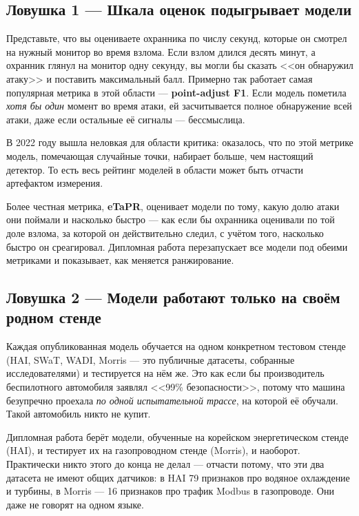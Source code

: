 \documentclass[11pt,a4paper]{article}
\begin{document}
\subsection{Ловушка 1 --- Шкала оценок подыгрывает модели}

Представьте, что вы оцениваете охранника по числу секунд, которые он смотрел на нужный монитор во время взлома. Если взлом длился десять минут, а охранник глянул на монитор одну секунду, вы могли бы сказать <<он обнаружил атаку>> и поставить максимальный балл. Примерно так работает самая популярная метрика в этой области --- \textbf{point-adjust F1}. Если модель пометила \emph{хотя бы один} момент во время атаки, ей засчитывается полное обнаружение всей атаки, даже если остальные её сигналы --- бессмыслица.

В 2022 году вышла неловкая для области критика: оказалось, что по этой метрике модель, помечающая случайные точки, набирает больше, чем настоящий детектор. То есть весь рейтинг моделей в области может быть отчасти артефактом измерения.

Более честная метрика, \textbf{eTaPR}, оценивает модели по тому, какую долю атаки они поймали и насколько быстро --- как если бы охранника оценивали по той доле взлома, за которой он действительно следил, с учётом того, насколько быстро он среагировал. Дипломная работа перезапускает все модели под обеими метриками и показывает, как меняется ранжирование.

\subsection{Ловушка 2 --- Модели работают только на своём родном стенде}

Каждая опубликованная модель обучается на одном конкретном тестовом стенде (HAI, SWaT, WADI, Morris --- это публичные датасеты, собранные исследователями) и тестируется на нём же. Это как если бы производитель беспилотного автомобиля заявлял <<99\% безопасности>>, потому что машина безупречно проехала \emph{по одной испытательной трассе}, на которой её обучали. Такой автомобиль никто не купит.

Дипломная работа берёт модели, обученные на корейском энергетическом стенде (HAI), и тестирует их на газопроводном стенде (Morris), и наоборот. Практически никто этого до конца не делал --- отчасти потому, что эти два датасета не имеют общих датчиков: в HAI 79 признаков про водяное охлаждение и турбины, в Morris --- 16 признаков про трафик Modbus в газопроводе. Они даже не говорят на одном языке.
\end{document}
